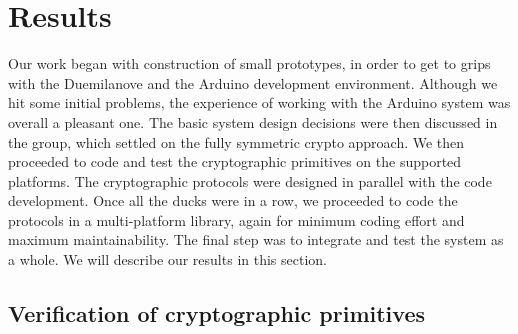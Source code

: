 
\chapter{Results}
\label{sec:results}

Our work began with construction of small prototypes, in order to get to grips with the Duemilanove and the Arduino development environment. Although we hit some initial problems, the experience of working with the Arduino system was overall a pleasant one. The basic system design decisions were then discussed in the group, which settled on the fully symmetric crypto approach. We then proceeded to code and test the cryptographic primitives on the supported platforms. The cryptographic protocols were designed in parallel with the code development. Once all the ducks were in a row, we proceeded to code the protocols in a multi-platform library, again for minimum coding effort and maximum maintainability. The final step was to integrate and test the system as a whole. We will describe our results in this section.

\section{Verification of cryptographic primitives}
\label{sec:verification-of-cryptographic-primitives}

